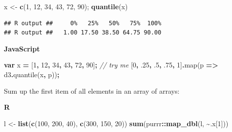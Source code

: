 \documentclass[
  openany]{book}
\newenvironment{Shaded}{\begin{snugshade}}{\end{snugshade}}
\newcommand{\CommentTok}[1]{\textcolor[rgb]{0.56,0.35,0.01}{\textit{#1}}}
\newcommand{\DecValTok}[1]{\textcolor[rgb]{0.00,0.00,0.81}{#1}}
\newcommand{\FloatTok}[1]{\textcolor[rgb]{0.00,0.00,0.81}{#1}}
\newcommand{\FunctionTok}[1]{\textcolor[rgb]{0.00,0.00,0.00}{#1}}
\newcommand{\KeywordTok}[1]{\textcolor[rgb]{0.13,0.29,0.53}{\textbf{#1}}}
\newcommand{\NormalTok}[1]{#1}
\newcommand{\OperatorTok}[1]{\textcolor[rgb]{0.81,0.36,0.00}{\textbf{#1}}}
\newcommand{\StringTok}[1]{\textcolor[rgb]{0.31,0.60,0.02}{#1}}
\begin{document}
\begin{Shaded}
\begin{Highlighting}[]
\NormalTok{x \textless{}{-}}\StringTok{ }\KeywordTok{c}\NormalTok{(}\DecValTok{1}\NormalTok{, }\DecValTok{12}\NormalTok{, }\DecValTok{34}\NormalTok{, }\DecValTok{43}\NormalTok{, }\DecValTok{72}\NormalTok{, }\DecValTok{90}\NormalTok{);  }
\KeywordTok{quantile}\NormalTok{(x)}
\end{Highlighting}
\end{Shaded}

\begin{verbatim}
## R output ##     0%   25%   50%   75%  100% 
## R output ##   1.00 17.50 38.50 64.75 90.00
\end{verbatim}

\textbf{JavaScript}

\begin{Shaded}
\begin{Highlighting}[]
\KeywordTok{var}\NormalTok{ x }\OperatorTok{=}\NormalTok{ [}\DecValTok{1}\OperatorTok{,} \DecValTok{12}\OperatorTok{,} \DecValTok{34}\OperatorTok{,} \DecValTok{43}\OperatorTok{,} \DecValTok{72}\OperatorTok{,} \DecValTok{90}\NormalTok{]}\OperatorTok{;}      \CommentTok{// try me}
\NormalTok{[}\DecValTok{0}\OperatorTok{,} \FloatTok{.25}\OperatorTok{,} \FloatTok{.5}\OperatorTok{,} \FloatTok{.75}\OperatorTok{,} \DecValTok{1}\NormalTok{]}\OperatorTok{.}\FunctionTok{map}\NormalTok{(p }\KeywordTok{=\textgreater{}}\NormalTok{ d3}\OperatorTok{.}\FunctionTok{quantile}\NormalTok{(x}\OperatorTok{,}\NormalTok{ p))}\OperatorTok{;}
\end{Highlighting}
\end{Shaded}

Sum up the first item of all elements in an array of arrays:

\textbf{R}

\begin{Shaded}
\begin{Highlighting}[]
\NormalTok{l \textless{}{-}}\StringTok{ }\KeywordTok{list}\NormalTok{(}\KeywordTok{c}\NormalTok{(}\DecValTok{100}\NormalTok{, }\DecValTok{200}\NormalTok{, }\DecValTok{40}\NormalTok{), }\KeywordTok{c}\NormalTok{(}\DecValTok{300}\NormalTok{, }\DecValTok{150}\NormalTok{, }\DecValTok{20}\NormalTok{))}
\KeywordTok{sum}\NormalTok{(purrr}\OperatorTok{::}\KeywordTok{map\_dbl}\NormalTok{(l, }\OperatorTok{\textasciitilde{}}\NormalTok{.x[}\DecValTok{1}\NormalTok{]))}
\end{Highlighting}
\end{Shaded}
\end{document}
